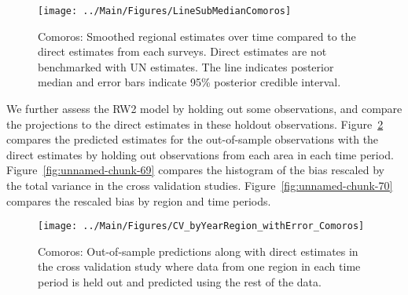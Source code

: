 \documentclass[12pt]{article}\usepackage[]{graphicx}\usepackage[]{color}
\newenvironment{knitrout}{}{} %
\begin{document}
\begin{knitrout}
\color{fgcolor}\begin{figure}[bht]

{\centering \texttt{[image: ../Main/Figures/LineSubMedianComoros]} 

}

\caption[Comoros]{Comoros: Smoothed regional estimates over time compared to the direct estimates from each surveys. Direct estimates are not benchmarked with UN estimates. The line indicates posterior median and error bars indicate 95\% posterior credible interval.}\label{fig:unnamed-chunk-67}
\end{figure}


\end{knitrout}
We further assess the RW2 model by holding out some observations, and compare the projections to the direct estimates in these holdout observations. Figure~\ref{fig:unnamed-chunk-68} compares the predicted estimates for the out-of-sample observations  with the direct estimates by holding out observations from each area in each time period.  Figure~\ref{fig:unnamed-chunk-69} compares the histogram of the bias rescaled by the total variance in the cross validation studies. Figure~\ref{fig:unnamed-chunk-70} compares the rescaled bias by region and time periods.



 
\begin{knitrout}
\color{fgcolor}\begin{figure}[bht]

{\centering \texttt{[image: ../Main/Figures/CV\_byYearRegion\_withError\_Comoros]} 

}

\caption[Comoros]{Comoros: Out-of-sample predictions along with direct estimates in the cross validation study where data from one region in each time period is held out and predicted using the rest of the data.}\label{fig:unnamed-chunk-68}
\end{figure}


\end{knitrout}
\end{document}
